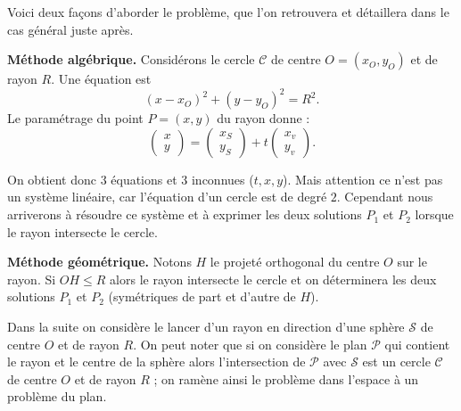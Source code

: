 \documentclass[11pt,class=report,crop=false]{standalone}
\begin{document}

Voici deux façons d'aborder le problème, que l'on retrouvera et détaillera dans le cas général juste après.

\textbf{Méthode algébrique.}
Considérons le cercle $\mathcal{C}$ de centre $O = (x_O,y_O)$ et de rayon $R$. Une équation est
$$(x-x_O)^2 + (y-y_O)^2 = R^2.$$
Le paramétrage du point $P=(x,y) $ du rayon donne :
$$
\begin{pmatrix}x\\y\end{pmatrix}
= \begin{pmatrix}x_S\\y_S\end{pmatrix} + t \begin{pmatrix}x_v\\y_v\end{pmatrix}
.$$

On obtient donc $3$ équations et $3$ inconnues ($t,x,y$). Mais attention ce n'est pas un système linéaire, car l'équation d'un cercle est de degré $2$. 
Cependant nous arriverons à résoudre ce système et à exprimer les deux solutions $P_1$ et $P_2$ lorsque le rayon intersecte le cercle.

\medskip
\textbf{Méthode géométrique.}
Notons $H$ le projeté orthogonal du centre $O$ sur le rayon.
Si $OH \le R$ alors le rayon intersecte le cercle et on déterminera les deux solutions 
$P_1$ et $P_2$ (symétriques de part et d'autre de $H$).

\begin{center}
\begin{minipage}{0.45\textwidth}
\end{minipage}\quad
\begin{minipage}{0.45\textwidth}
\end{minipage}
\end{center}

\bigskip

Dans la suite on considère le lancer d'un rayon en direction d'une sphère $\mathcal{S}$ de centre $O$ et de rayon $R$. On peut noter que si on considère le plan $\mathcal{P}$ qui contient le rayon et le centre de la sphère alors l'intersection de $\mathcal{P}$ avec $\mathcal{S}$ est un cercle $\mathcal{C}$ de centre $O$ et de rayon $R$ ; on ramène ainsi le problème dans l'espace à un problème du plan.

\begin{center}
	\begin{minipage}{0.55\textwidth}
	\end{minipage}\quad
	\begin{minipage}{0.35\textwidth}
	\end{minipage}
\end{center}
\end{document}
